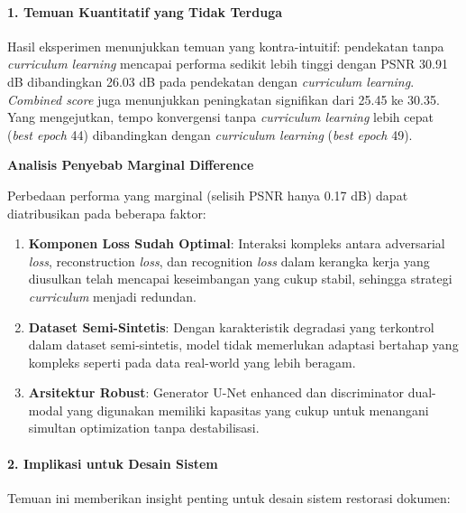 \documentclass[12pt,a4paper]{article}
\begin{document}
\paragraph{1. Temuan Kuantitatif yang Tidak Terduga}

Hasil eksperimen menunjukkan temuan yang kontra-intuitif: pendekatan tanpa \textit{curriculum learning} mencapai performa sedikit lebih tinggi dengan PSNR 30.91 dB dibandingkan 26.03 dB pada pendekatan dengan \textit{curriculum learning}. \textit{Combined score} juga menunjukkan peningkatan signifikan dari 25.45 ke 30.35. Yang mengejutkan, tempo konvergensi tanpa \textit{curriculum learning} lebih cepat (\textit{best epoch} 44) dibandingkan dengan \textit{curriculum learning} (\textit{best epoch} 49).

\textbf{Analisis Penyebab Marginal Difference}

Perbedaan performa yang marginal (selisih PSNR hanya 0.17 dB) dapat diatribusikan pada beberapa faktor:

\begin{enumerate}[leftmargin=*]
\item\textbf{Komponen Loss Sudah Optimal}: Interaksi kompleks antara adversarial \textit{loss}, reconstruction \textit{loss}, dan recognition \textit{loss} dalam kerangka kerja yang diusulkan telah mencapai keseimbangan yang cukup stabil, sehingga strategi \textit{curriculum} menjadi redundan.

\item\textbf{Dataset Semi-Sintetis}: Dengan karakteristik degradasi yang terkontrol dalam dataset semi-sintetis, model tidak memerlukan adaptasi bertahap yang kompleks seperti pada data real-world yang lebih beragam.

\item\textbf{Arsitektur Robust}: Generator U-Net enhanced dan discriminator dual-modal yang digunakan memiliki kapasitas yang cukup untuk menangani simultan optimization tanpa destabilisasi.
\end{enumerate}

\paragraph{2. Implikasi untuk Desain Sistem}

Temuan ini memberikan insight penting untuk desain sistem restorasi dokumen:
\end{document}
